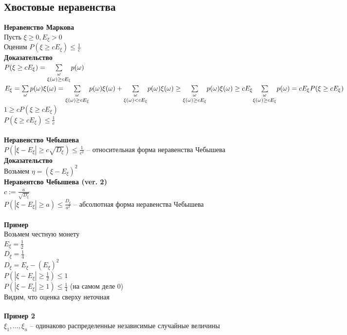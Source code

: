 \documentclass[12pt]{article}
\begin{document}
\subsection{Хвостовые неравенства}
\textbf{Неравенство Маркова}\\
Пусть $\xi \geq 0, E_\xi > 0$\\
Оценим $P(\xi \geq cE_\xi) \leq \frac1c$\\
\textbf{Доказательство}\\
$P(\xi \geq cE_\xi) = \underset{\xi(\omega) \geq cE_\xi}{\sum\limits_{\omega}} p(\omega)$\\
$E_\xi = \sum\limits_\omega p(\omega)\xi(\omega) = \underset{\xi(\omega) \geq cE_\xi}{\sum\limits_{\omega}} p(\omega)\xi(\omega) + \underset{\xi(\omega) < cE_\xi}{\sum\limits_{\omega}} p(\omega)\xi(\omega) \geq \underset{\xi(\omega) \geq cE_\xi}{\sum\limits_{\omega}} p(\omega)\xi(\omega) \geq cE_\xi \underset{\xi(\omega) \geq cE_\xi}{\sum\limits_{\omega}} p(\omega) = cE_\xi P(\xi \geq cE_\xi)$\\
$1 \geq cP(\xi \geq cE_\xi)$\\
$P(\xi \geq cE_\xi) \leq \frac1c$\\\\
\textbf{Неравенство Чебышева}\\
$P(|\xi - E_\xi| \geq c\sqrt{D_\xi}) \leq \frac1{c^2}$  -- относительная форма неравенства Чебышева\\
\textbf{Доказательство}\\
Возьмем $\eta = (\xi - E_\xi)^2$\\
\textbf{Неравентсво Чебышева (ver. 2)}\\
$c := \frac{a}{\sqrt{D_\xi}}$\\
$P(|\xi - E_\xi| \geq a) \leq \frac{D_\xi}{a^2}$ -- абсолютная форма неравенства Чебышева\\\\
\textbf{Пример}\\
Возьмем честную монету\\
$E_\xi = \frac12$\\
$D_\xi = \frac14$\\
$D_\xi = E_\xi - (E_\xi)^2$\\
$P(|\xi - E_\xi| \geq \frac12) \leq 1$\\
$P(|\xi - E_\xi| \geq 1) \leq \frac14$ (на самом деле 0)\\
Видим, что оценка сверху неточная\\\\
\textbf{Пример 2}\\
$\xi_1, \ldots, \xi_n$ -- одинаково распределенные независимые случайные величины\\
\end{document}
